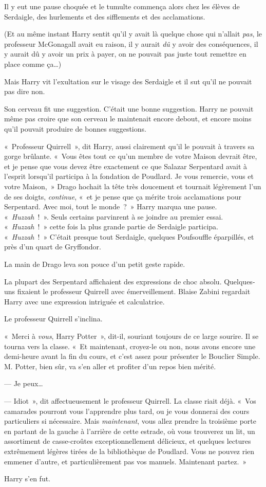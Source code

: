 Il y eut une pause choquée et le tumulte commença alors chez les élèves de Serdaigle, des hurlements et des sifflements et des acclamations.

(Et au même instant Harry sentit qu'il y avait là quelque chose qui n'allait \emph{pas}, le professeur McGonagall avait eu raison, il y aurait \emph{dû} y avoir des conséquences, il y aurait dû y avoir un prix à payer, on ne pouvait pas juste tout remettre en place comme ça…)

Mais Harry vit l'exultation sur le visage des Serdaigle et il sut qu'il ne pouvait pas dire non.

Son cerveau fit une suggestion. C'était une bonne suggestion. Harry ne pouvait même pas croire que son cerveau le maintenait encore debout, et encore moins qu'il pouvait produire de bonnes suggestions.

«~Professeur Quirrell~», dit Harry, aussi clairement qu'il le pouvait à travers sa gorge brûlante. «~Vous êtes tout ce qu'un membre de votre Maison devrait être, et je pense que vous devez être exactement ce que Salazar Serpentard avait à l'esprit lorsqu'il participa à la fondation de Poudlard. Je vous remercie, vous et votre Maison,~» Drago hochait la tête très doucement et tournait légèrement l'un de ses doigts, \emph{continue}, «~et je pense que ça mérite trois acclamations pour Serpentard. Avec moi, tout le monde~?~» Harry marqua une pause. «~\emph{Huzzah}~!~». Seuls certains parvinrent à se joindre au premier essai. «~\emph{Huzzah}~!~» cette fois la plus grande partie de Serdaigle participa. «~\emph{Huzzah}~!~» C'était presque tout Serdaigle, quelques Poufsouffle éparpillés, et près d'un quart de Gryffondor.

La main de Drago leva son pouce d'un petit geste rapide.

La plupart des Serpentard affichaient des expressions de choc absolu. Quelques-uns fixaient le professeur Quirrell avec émerveillement. Blaise Zabini regardait Harry avec une expression intriguée et calculatrice.

Le professeur Quirrell s'inclina.

«~Merci à \emph{vous}, Harry Potter~», dit-il, souriant toujours de ce large sourire. Il se tourna vers la classe. «~Et maintenant, croyez-le ou non, nous avons encore une demi-heure avant la fin du cours, et c'est assez pour présenter le Bouclier Simple. M. Potter, bien sûr, va s'en aller et profiter d'un repos bien mérité.

--- Je peux…

--- Idiot~», dit affectueusement le professeur Quirrell. La classe riait déjà. «~Vos camarades pourront vous l'apprendre plus tard, ou je vous donnerai des cours particuliers si nécessaire. Mais \emph{maintenant}, vous allez prendre la troisième porte en partant de la gauche à l'arrière de cette estrade, où vous trouverez un lit, un assortiment de casse-croûtes exceptionnellement délicieux, et quelques lectures extrêmement légères tirées de la bibliothèque de Poudlard. Vous ne pouvez rien emmener d'autre, et particulièrement pas vos manuels. Maintenant partez.~»

Harry s'en fut.

